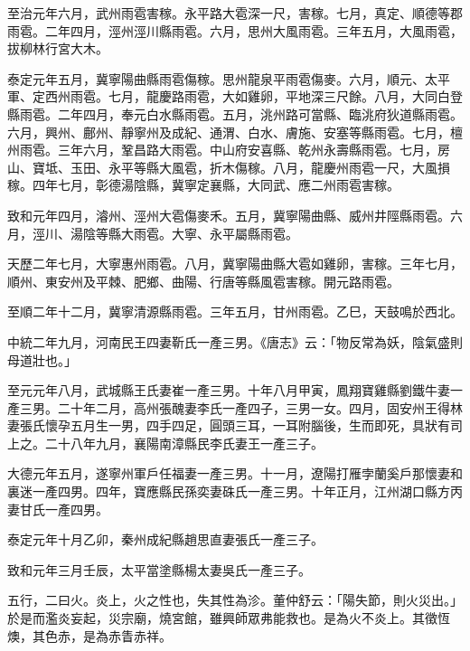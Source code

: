 \begin{pinyinscope}
 至治元年六月，武州雨雹害稼。永平路大雹深一尺，害稼。七月，真定、順德等郡雨雹。二年四月，涇州涇川縣雨雹。六月，思州大風雨雹。三年五月，大風雨雹，拔柳林行宮大木。



 泰定元年五月，冀寧陽曲縣雨雹傷稼。思州龍泉平雨雹傷麥。六月，順元、太平軍、定西州雨雹。七月，龍慶路雨雹，大如雞卵，平地深三尺餘。八月，大同白登縣雨雹。二年四月，奉元白水縣雨雹。五月，洮州路可當縣、臨洮府狄道縣雨雹。六月，興州、鄜州、靜寧州及成紀、通渭、白水、膚施、安塞等縣雨雹。七月，檀州雨雹。三年六月，鞏昌路大雨雹。中山府安喜縣、乾州永壽縣雨雹。七月，房山、寶坻、玉田、永平等縣大風雹，折木傷稼。八月，龍慶州雨雹一尺，大風損稼。四年七月，彰德湯陰縣，冀寧定襄縣，大同武、應二州雨雹害稼。



 致和元年四月，濬州、涇州大雹傷麥禾。五月，冀寧陽曲縣、威州井陘縣雨雹。六月，涇川、湯陰等縣大雨雹。大寧、永平屬縣雨雹。



 天歷二年七月，大寧惠州雨雹。八月，冀寧陽曲縣大雹如雞卵，害稼。三年七月，順州、東安州及平棘、肥鄉、曲陽、行唐等縣風雹害稼。開元路雨雹。



 至順二年十二月，冀寧清源縣雨雹。三年五月，甘州雨雹。乙巳，天鼓鳴於西北。



 中統二年九月，河南民王四妻靳氏一產三男。《唐志》云：「物反常為妖，陰氣盛則母道壯也。」



 至元元年八月，武城縣王氏妻崔一產三男。十年八月甲寅，鳳翔寶雞縣劉鐵牛妻一產三男。二十年二月，高州張醜妻李氏一產四子，三男一女。四月，固安州王得林妻張氏懷孕五月生一男，四手四足，圓頭三耳，一耳附腦後，生而即死，具狀有司上之。二十八年九月，襄陽南漳縣民李氏妻王一產三子。



 大德元年五月，遂寧州軍戶任福妻一產三男。十一月，遼陽打雁孛蘭奚戶那懷妻和裏迷一產四男。四年，寶應縣民孫奕妻硃氏一產三男。十年正月，江州湖口縣方丙妻甘氏一產四男。



 泰定元年十月乙卯，秦州成紀縣趙思直妻張氏一產三子。



 致和元年三月壬辰，太平當塗縣楊太妻吳氏一產三子。



 五行，二曰火。炎上，火之性也，失其性為沴。董仲舒云：「陽失節，則火災出。」於是而濫炎妄起，災宗廟，燒宮館，雖興師眾弗能救也。是為火不炎上。其徵恆燠，其色赤，是為赤眚赤祥。




\end{pinyinscope}
